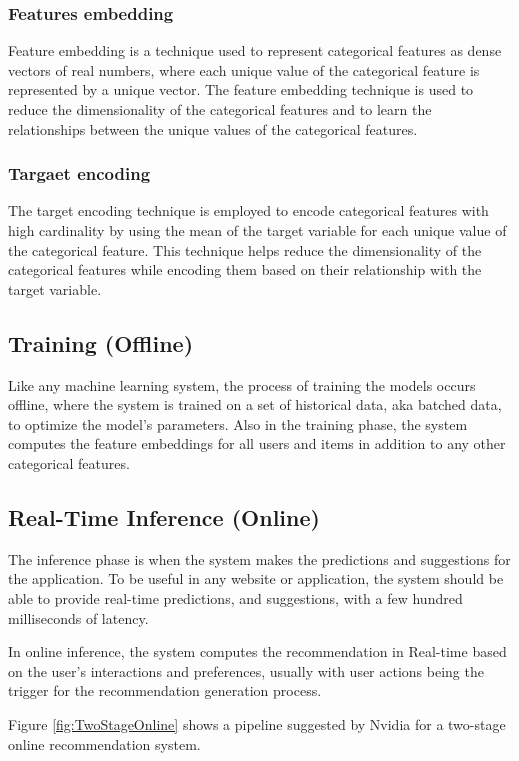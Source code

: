 \subsubsection{Features embedding}
Feature embedding is a technique used to represent categorical features as dense vectors of real numbers, where each unique value of the categorical feature is represented by a unique vector. The feature embedding technique is used to reduce the dimensionality of the categorical features and to learn the relationships between the unique values of the categorical features.\cite{FeatureEmbedding}
\subsubsection{Targaet encoding}
The target encoding technique is employed to encode categorical features with high cardinality by using the mean of the target variable for each unique value of the categorical feature. This technique helps reduce the dimensionality of the categorical features while encoding them based on their relationship with the target variable.\cite{TargetEncoding}
\subsection{Training (Offline)}
Like any machine learning system, the process of training the models occurs offline,
where the system is trained on a set of historical data, aka batched data, to optimize the model's parameters.
Also in the training phase, the system computes the feature embeddings for all users and items in addition to any other categorical features.


\subsection{Real-Time Inference (Online)}
The inference phase is when the system makes the predictions and suggestions for the application.
To be useful in any website or application, 
the system should be able to provide real-time predictions, 
and suggestions, with a few hundred milliseconds of latency.

In online inference, the system computes the recommendation in Real-time based on the user's interactions and preferences, 
usually with user actions being the trigger for the recommendation generation process.

Figure \ref{fig:TwoStageOnline} shows a pipeline suggested by Nvidia\cite{NvidiaFeatureStores} for a two-stage online recommendation system.

